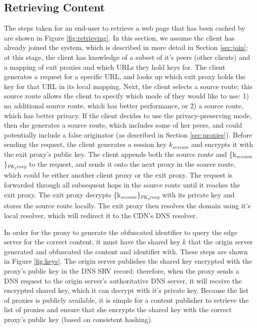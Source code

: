 \subsection{Retrieving Content}
\label{sec:retrieve}
The steps taken for an end-user to retrieve a web page that has been cached by \system{} are shown in Figure \ref{fig:retrieving}.  
In this section, we assume the client has already joined the system, which is described in more detail in Section \ref{sec:join}; at this 
stage, the client has knowledge of a subset of it's peers (other \system{} clients) and a mapping of exit proxies and which URLs they hold 
keys for.  The client generates a request for a specific URL, and looks up which exit proxy holds the key for that URL in its local mapping.  Next, 
the client selects a source route; this source route allows the client to specify which mode of \system{} they would like to use: 1) no additional source 
route, which has better performance, or 2) a source route, which has better privacy.  If the client decides to use the privacy-preserving mode, 
then she generates a source route, which includes some of her peers, and could potentially include a false originator (as described in Section \ref{sec:proxies}).
Before sending the request, the client generates a session key $k_{session}$ and encrypts it with the exit proxy's public key.  The client appends both the source route and \{k$_{session}$\}$_{PK_proxy}$ to the request, and sends it onto the next proxy in the source route, which could be either another client proxy or the exit proxy.  The request is forwarded 
through all subsequent hops in the source route until it reaches the exit proxy.  The exit proxy decrypts \{k$_{session}$\}$_{PK_proxy}$ with its private key and stores 
the source route locally.   The exit proxy then resolves the domain using it's local resolver, which will redirect it to the CDN's DNS resolver. 

In order for the proxy to generate the obfuscated identifier to query the edge server for the correct content, 
it must have the shared key $k$ that the origin server generated and obfuscated the content and identifier 
with.  These steps are shown in Figure \ref{fig:keys}.  The origin server publishes the shared key encrypted with the proxy's public key%
in the DNS SRV record; therefore, 
when the proxy sends a DNS request to the origin server's authoritative DNS server, it will receive the encrypted shared 
key, which it can decrypt with it's private key.  Because the list of \system{} proxies is publicly available, it is simple for a 
content publisher to retrieve the list of proxies and ensure that she encrypts the shared key with the correct proxy's public key (based on consistent hashing).


